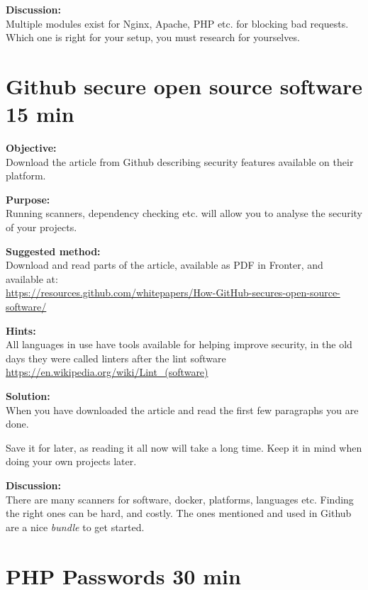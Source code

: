 \documentclass[a4paper,11pt,notitlepage]{report}
\begin{document}
{\bf Discussion:}\\
Multiple modules exist for Nginx, Apache, PHP etc. for blocking bad requests.
Which one is right for your setup, you must research for yourselves.



\chapter{Github secure open source software 15 min}
\label{ex:github-scanning}


{\bf Objective:}\\
Download the article from Github describing security features available on their platform.


{\bf Purpose:}\\
Running scanners, dependency checking etc. will allow you to analyse the security of your projects.



{\bf Suggested method:}\\
Download and read parts of the article, available as PDF in Fronter, and available at:\\
\url{https://resources.github.com/whitepapers/How-GitHub-secures-open-source-software/}

{\bf Hints:}\\
All languages in use have tools available for helping improve security, in the old days they were called linters after the lint software\\
\url{https://en.wikipedia.org/wiki/Lint_(software)}

{\bf Solution:}\\
When you have downloaded the article and read the first few paragraphs you are done.

Save it for later, as reading it all now will take a long time. Keep it in mind when doing your own projects later.

{\bf Discussion:}\\
There are many scanners for software, docker, platforms, languages etc. Finding the right ones can be hard, and costly. The ones mentioned and used in Github are a nice \emph{bundle} to get started.




\chapter{PHP Passwords 30 min}
\label{ex:php-passwords}
\end{document}
